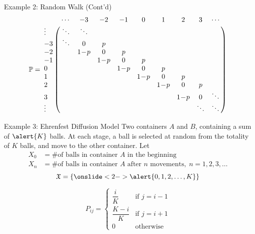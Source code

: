 \documentclass[letterpaper,mathserif,handout]{beamer}
\def\P{\mathbb{P}}
\def\X{\mathfrak{X}}
\def\hid#1#2{\onslide<#1>{\alert{#2}}}
\begin{document}
\begin{frame}{Example 2: Random Walk (Cont'd)}
\small
$$\P=
\bordermatrix{%
       & \cdots & -3  & -2  & -1  &  0  &  1  &  2  &  3   & \cdots\cr
\vdots & \ddots &\ddots&    &     &     &     &     &      &       \cr
-3     & \ddots &  0  &  p  &     &     &     &     &      &       \cr
-2     &        & 1\!-\!p &  0  &  p  &     &     &     &      &       \cr
-1     &        &     & 1\!-\!p &  0  &  p  &     &     &      &       \cr
 0     &        &     &     & 1\!-\!p &  0  &  p  &     &      &       \cr
 1     &        &     &     &     & 1\!-\!p &  0  &  p  &      &       \cr
 2     &        &     &     &     &     & 1\!-\!p &  0  &  p   &       \cr
 3     &        &     &     &     &     &     & 1\!-\!p &  0   & \ddots\cr
\vdots &        &     &     &     &     &     &     &\ddots& \ddots
}
$$
\end{frame}
\begin{frame}{Example 3: Ehrenfest Diffusion Model}
Two containers $A$ and $B$, containing a sum of $\alert{K}$ balls.
At each stage, a ball is selected at random from the totality of $K$ balls, and move to the other container.
Let
\begin{align*}
X_0 &= \mbox{\# of balls in container $A$ in the beginning}\\
X_n &= \mbox{\# of balls in container $A$ after $n$ movements},\;n=1,2,3,\ldots
\end{align*}
$$
\X=\{\hid{2-}{0,1,2,\ldots,K}\}
$$

$$
P_{ij}=
\begin{cases}
\dfrac{i}{K}    & \mbox{if }j=i-1\\[10pt]
\dfrac{K-i}{K} & \mbox{if }j=i+1\\
0   & \mbox{otherwise}
\end{cases}
$$
\end{frame}
\end{document}
